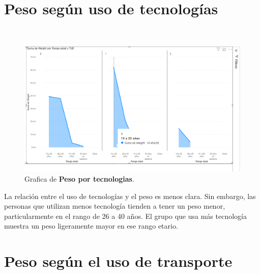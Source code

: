 \documentclass[a4paper]{report} %
\begin{document}
\section{Peso según uso de tecnologías}
\paragraph{}\mbox{} \\
\begin{figure}[htb]
                \centering
                  \includegraphics[width=\textwidth]{Images/pesoportecnologias.png}
                  \caption{Grafica de \textbf{Peso por tecnologias}.}
              \end{figure} 
La relación entre el uso de tecnologías y el peso es menos clara. Sin embargo, las personas que utilizan menos tecnología tienden a tener un peso menor, particularmente en el rango de 26 a 40 años. El grupo que usa más tecnología muestra un peso ligeramente mayor en ese rango etario.
\section{Peso según el uso de transporte}
\end{document}
